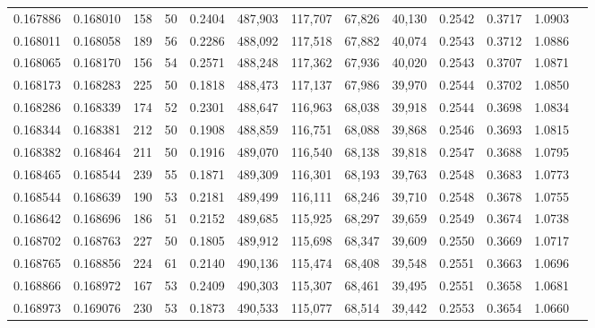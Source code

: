 \begin{tabular}{rrrrrrrrrrrrr}
0.167886 & 0.168010 &   158 &  50 &                                     0.2404 & 487,903 & 117,707 &  67,826 &  40,130 & 0.2542 & 0.3717 & 1.0903 \\
0.168011 & 0.168058 &   189 &  56 &                                     0.2286 & 488,092 & 117,518 &  67,882 &  40,074 & 0.2543 & 0.3712 & 1.0886 \\
0.168065 & 0.168170 &   156 &  54 &                                     0.2571 & 488,248 & 117,362 &  67,936 &  40,020 & 0.2543 & 0.3707 & 1.0871 \\
0.168173 & 0.168283 &   225 &  50 &                                     0.1818 & 488,473 & 117,137 &  67,986 &  39,970 & 0.2544 & 0.3702 & 1.0850 \\
0.168286 & 0.168339 &   174 &  52 &                                     0.2301 & 488,647 & 116,963 &  68,038 &  39,918 & 0.2544 & 0.3698 & 1.0834 \\
0.168344 & 0.168381 &   212 &  50 &                                     0.1908 & 488,859 & 116,751 &  68,088 &  39,868 & 0.2546 & 0.3693 & 1.0815 \\
0.168382 & 0.168464 &   211 &  50 &                                     0.1916 & 489,070 & 116,540 &  68,138 &  39,818 & 0.2547 & 0.3688 & 1.0795 \\
0.168465 & 0.168544 &   239 &  55 &                                     0.1871 & 489,309 & 116,301 &  68,193 &  39,763 & 0.2548 & 0.3683 & 1.0773 \\
0.168544 & 0.168639 &   190 &  53 &                                     0.2181 & 489,499 & 116,111 &  68,246 &  39,710 & 0.2548 & 0.3678 & 1.0755 \\
0.168642 & 0.168696 &   186 &  51 &                                     0.2152 & 489,685 & 115,925 &  68,297 &  39,659 & 0.2549 & 0.3674 & 1.0738 \\
0.168702 & 0.168763 &   227 &  50 &                                     0.1805 & 489,912 & 115,698 &  68,347 &  39,609 & 0.2550 & 0.3669 & 1.0717 \\
0.168765 & 0.168856 &   224 &  61 &                                     0.2140 & 490,136 & 115,474 &  68,408 &  39,548 & 0.2551 & 0.3663 & 1.0696 \\
0.168866 & 0.168972 &   167 &  53 &                                     0.2409 & 490,303 & 115,307 &  68,461 &  39,495 & 0.2551 & 0.3658 & 1.0681 \\
0.168973 & 0.169076 &   230 &  53 &                                     0.1873 & 490,533 & 115,077 &  68,514 &  39,442 & 0.2553 & 0.3654 & 1.0660 \\

\end{tabular}
